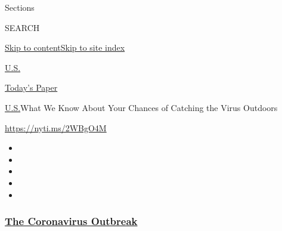 Sections

SEARCH

\protect\hyperlink{site-content}{Skip to
content}\protect\hyperlink{site-index}{Skip to site index}

\href{https://www.nytimes3xbfgragh.onion/section/us}{U.S.}

\href{https://myaccount.nytimes3xbfgragh.onion/auth/login?response_type=cookie\&client_id=vi}{}

\href{https://www.nytimes3xbfgragh.onion/section/todayspaper}{Today's
Paper}

\href{/section/us}{U.S.}\textbar{}What We Know About Your Chances of
Catching the Virus Outdoors

\url{https://nyti.ms/2WBgO4M}

\begin{itemize}
\item
\item
\item
\item
\item
\end{itemize}

\hypertarget{the-coronavirus-outbreak}{%
\subsubsection{\texorpdfstring{\href{https://www.nytimes3xbfgragh.onion/news-event/coronavirus?name=styln-coronavirus-national\&region=TOP_BANNER\&block=storyline_menu_recirc\&action=click\&pgtype=Article\&impression_id=38bfacf0-efbb-11ea-a941-d3ff0b5fd50c\&variant=undefined}{The
Coronavirus
Outbreak}}{The Coronavirus Outbreak}}\label{the-coronavirus-outbreak}}

